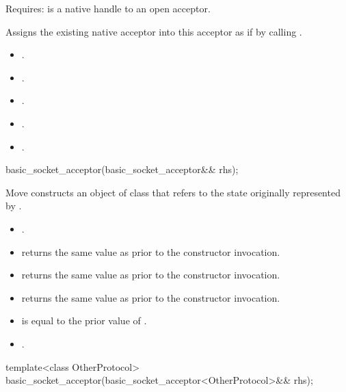 \begin{itemdescr}
\pnum
Requires:  is a native handle to an open acceptor.

\pnum
\effects Assigns the existing native acceptor into this acceptor as if by calling .

\pnum
\postconditions 
\begin{itemize}
\item
{}.
\item
{}.
\item
{}.
\item
{}.
\item
{}.
\end{itemize}
\end{itemdescr}

\begin{itemdecl}
basic_socket_acceptor(basic_socket_acceptor&& rhs);
\end{itemdecl}

\begin{itemdescr}
\pnum
\effects Move constructs an object of class  that refers to the state originally represented by .

\pnum
\postconditions 
\begin{itemize}
\item
{}.
\item
{} returns the same value as  prior to the constructor invocation.
\item
{} returns the same value as  prior to the constructor invocation.
\item
{} returns the same value as  prior to the constructor invocation.
\item
{} is equal to the prior value of .
\item
{}.
\end{itemize}
\end{itemdescr}

\begin{itemdecl}
template<class OtherProtocol>
  basic_socket_acceptor(basic_socket_acceptor<OtherProtocol>&& rhs);
\end{itemdecl}

